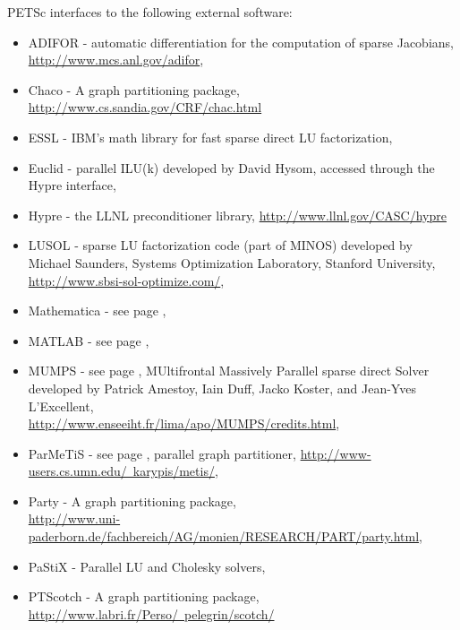 \vspace{.3in}
\noindent
PETSc interfaces to the following external software:
\begin{itemize}
  \item ADIFOR -  automatic differentiation for the computation of sparse Jacobians,\\
                     \href{http://www.mcs.anl.gov/adifor}{http://www.mcs.anl.gov/adifor},
  \item Chaco -     A graph partitioning package, \href{ http://www.cs.sandia.gov/CRF/chac.html}{ http://www.cs.sandia.gov/CRF/chac.html}
  \item ESSL -         IBM's math library for fast sparse direct LU factorization,
  \item Euclid  -   parallel ILU(k) developed by David Hysom, accessed through the Hypre interface,
  \item Hypre -    the LLNL preconditioner library, \href{http://www.llnl.gov/CASC/hypre}{http://www.llnl.gov/CASC/hypre}
  \item LUSOL -       sparse LU factorization code (part of MINOS) developed by Michael Saunders,
                      Systems Optimization Laboratory, Stanford University,
                     \href{http://www.sbsi-sol-optimize.com/}{http://www.sbsi-sol-optimize.com/},
  \item Mathematica -  see page \pageref{ch_mathematica},
  \item MATLAB -      see page \pageref{ch_matlab},
  \item MUMPS -      see page \pageref{sec_externalsol}, MUltifrontal Massively Parallel sparse direct Solver developed by Patrick Amestoy,
                     Iain Duff, Jacko Koster, and Jean-Yves L'Excellent, \\
                     \href{http://www.enseeiht.fr/lima/apo/MUMPS/credits.html}{http://www.enseeiht.fr/lima/apo/MUMPS/credits.html},
  \item ParMeTiS -     see page \pageref{sec_partitioning}, parallel graph partitioner,
                     \href{http://www-users.cs.umn.edu/~karypis/metis/}{http://www-users.cs.umn.edu/~karypis/metis/},
  \item Party -     A graph partitioning package, \\ \href{http://www.uni-paderborn.de/fachbereich/AG/monien/RESEARCH/PART/party.html}{http://www.uni-paderborn.de/fachbereich/AG/monien/RESEARCH/PART/party.html},
  \item PaStiX -     Parallel LU and Cholesky solvers,
  \item PTScotch -    A graph partitioning package, \href{http://www.labri.fr/Perso/~pelegrin/scotch/}{http://www.labri.fr/Perso/~pelegrin/scotch/}

\end{itemize}
